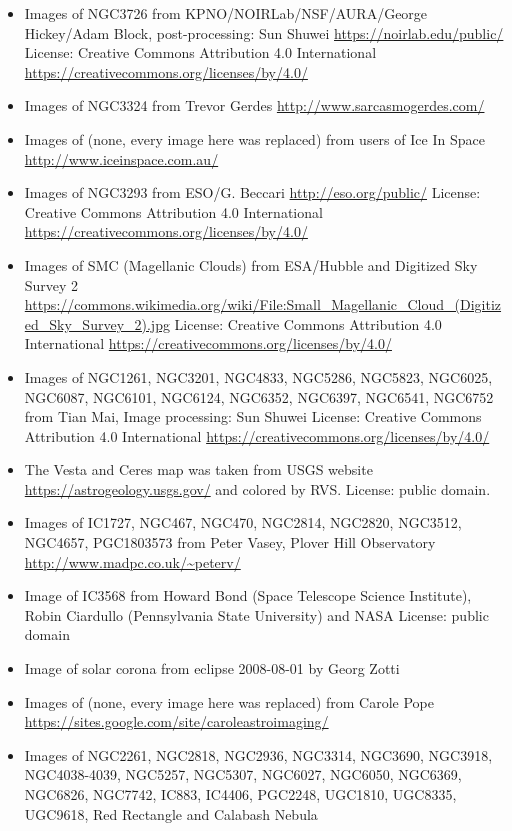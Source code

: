 \begin{itemize}
\item Images of NGC3726
	 from KPNO/NOIRLab/NSF/AURA/George Hickey/Adam Block, post-processing: Sun Shuwei
	 \url{https://noirlab.edu/public/}
	 License: Creative Commons Attribution 4.0 International \url{https://creativecommons.org/licenses/by/4.0/}
\item Images of NGC3324
	 from Trevor Gerdes
	 \url{http://www.sarcasmogerdes.com/}
\item Images of (none, every image here was replaced)
	 from users of Ice In Space
	 \url{http://www.iceinspace.com.au/}
\item Images of NGC3293
	 from ESO/G. Beccari
	 \url{http://eso.org/public/}
	 License: Creative Commons Attribution 4.0 International \url{https://creativecommons.org/licenses/by/4.0/}
\item Images of SMC (Magellanic Clouds)
	 from ESA/Hubble and Digitized Sky Survey 2
	 \url{https://commons.wikimedia.org/wiki/File:Small_Magellanic_Cloud_(Digitized_Sky_Survey_2).jpg}
	 License: Creative Commons Attribution 4.0 International \url{https://creativecommons.org/licenses/by/4.0/}
\item Images of NGC1261, NGC3201, NGC4833, NGC5286, NGC5823, NGC6025, NGC6087,
	 NGC6101, NGC6124, NGC6352, NGC6397, NGC6541, NGC6752
	 from Tian Mai, Image processing: Sun Shuwei
	 License: Creative Commons Attribution 4.0 International \url{https://creativecommons.org/licenses/by/4.0/}
\item The Vesta and Ceres map was taken from USGS website
	 \url{https://astrogeology.usgs.gov/}
	 and colored by RVS. License: public domain.
\item Images of IC1727, NGC467, NGC470, NGC2814, NGC2820, NGC3512, NGC4657,
	 PGC1803573
	 from Peter Vasey, Plover Hill Observatory
	 \url{http://www.madpc.co.uk/~peterv/}
\item Image of IC3568 from Howard Bond (Space Telescope Science Institute), Robin Ciardullo (Pennsylvania State University) and NASA
	 License: public domain
\item Image of solar corona from eclipse 2008-08-01 by Georg Zotti
\item Images of (none, every image here was replaced) from Carole Pope
	 \url{https://sites.google.com/site/caroleastroimaging/}
\item Images of NGC2261, NGC2818, NGC2936, NGC3314, NGC3690, NGC3918,
	 NGC4038-4039, NGC5257, NGC5307, NGC6027, NGC6050, NGC6369, NGC6826, NGC7742, IC883,
	 IC4406, PGC2248, UGC1810, UGC8335, UGC9618, Red Rectangle and Calabash Nebula

\end{itemize}
